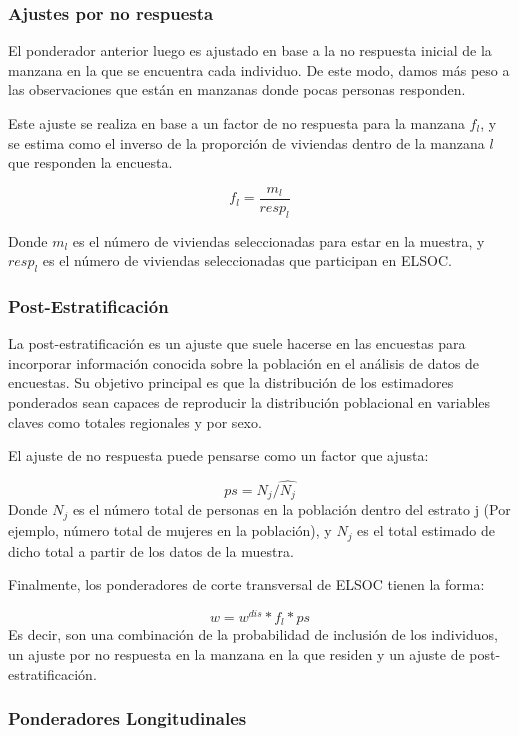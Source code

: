 \documentclass[
  12pt,
]{article}
\begin{document}
\hypertarget{ajustes-por-no-respuesta}{%
\subsubsection{Ajustes por no respuesta}\label{ajustes-por-no-respuesta}}

El ponderador anterior luego es ajustado en base a la no respuesta inicial de la manzana en la que se encuentra cada individuo. De este modo, damos más peso a las observaciones que están en manzanas donde pocas personas responden.

Este ajuste se realiza en base a un factor de no respuesta para la manzana \(f_l\), y se estima como el inverso de la proporción de viviendas dentro de la manzana \(l\) que responden la encuesta.

\[f_l=\frac{m_l}{resp_l}\]

Donde \(m_l\) es el número de viviendas seleccionadas para estar en la muestra, y \(resp_l\) es el número de viviendas seleccionadas que participan en ELSOC.

\hypertarget{post-estratificaciuxf3n}{%
\subsubsection{Post-Estratificación}\label{post-estratificaciuxf3n}}

La post-estratificación es un ajuste que suele hacerse en las encuestas para incorporar información conocida sobre la población en el análisis de datos de encuestas. Su objetivo principal es que la distribución de los estimadores ponderados sean capaces de reproducir la distribución poblacional en variables claves como totales regionales y por sexo.

El ajuste de no respuesta puede pensarse como un factor que ajusta:

\[ps=N_j/\hat{N_j}\]
Donde \(N_j\) es el número total de personas en la población dentro del estrato j (Por ejemplo, número total de mujeres en la población), y \(\hat N_j\) es el total estimado de dicho total a partir de los datos de la muestra.

Finalmente, los ponderadores de corte transversal de ELSOC tienen la forma:

\[w=w^{dis}*f_l*ps\]
Es decir, son una combinación de la probabilidad de inclusión de los individuos, un ajuste por no respuesta en la manzana en la que residen y un ajuste de post-estratificación.

\hypertarget{ponderadores-longitudinales}{%
\subsubsection{Ponderadores Longitudinales}\label{ponderadores-longitudinales}}
\end{document}
